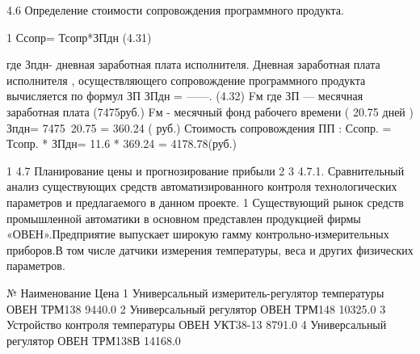 \begin{ESKDexplanation}
\begin{ESKDexplanation}
\begin{ESKDexplanation}
\begin{ESKDexplanation}
4.6  Определение стоимости сопровождения программного продукта.

	1	                         Ссопр= Тсопр*ЗПдн                                                                   (4.31)                                                                                                        
    
 где Зпдн- дневная заработная плата исполнителя.
Дневная заработная плата исполнителя , осуществляющего сопровождение
  программного продукта вычисляется по формул
                                                     ЗП
                                    ЗПдн =   ------.                                                                   (4.32)
                                                      Fм
где ЗП — месячная заработная плата (7475руб.)
Fм -   месячный фонд рабочего времени ( 20.75 дней )
                                     Зпдн=  7475\ 20.75 =  360.24 ( руб.)
Стоимость сопровождения ПП :
Ссопр. = Тсопр. *  ЗПдн= 11.6 * 369.24 = 4178.78(руб.)

	1	4.7  Планирование цены и прогнозирование прибыли
	2	
	3	4.7.1. Сравнительный анализ существующих средств автоматизированного
           контроля технологических параметров и предлагаемого в данном
           проекте.
	1	Существующий рынок средств промышленной автоматики в основном
представлен  продукцией фирмы  «ОВЕН».Предприятие выпускает   широкую
гамму контрольно-измерительных приборов.В том числе датчики измерения
температуры, веса и других физических параметров.

№
Наименование
Цена
1
Универсальный измеритель-регулятор температуры ОВЕН ТРМ138
9440.0
2
Универсальный регулятор ОВЕН ТРМ148
10325.0
3
Устройство контроля температуры ОВЕН УКТ38-13
8791.0
4
Универсальный регулятор ОВЕН ТРМ138В
14168.0
                                                                                       

\end{ESKDexplanation}
\end{ESKDexplanation}
\end{ESKDexplanation}
\end{ESKDexplanation}
